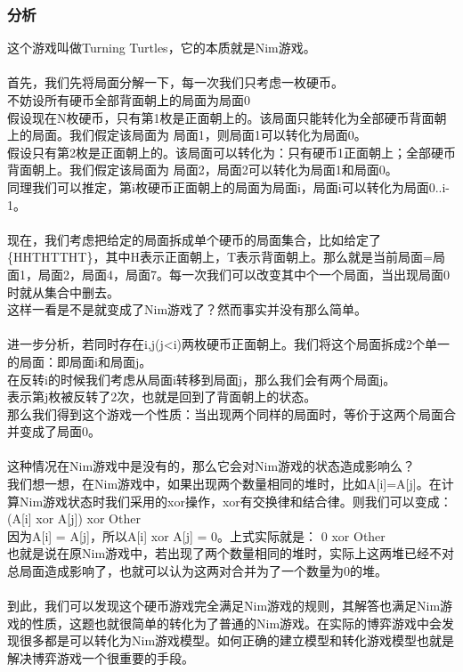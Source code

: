 	\subsubsection{分析}
	这个游戏叫做Turning Turtles，它的本质就是Nim游戏。\\
	\\
	首先，我们先将局面分解一下，每一次我们只考虑一枚硬币。\\
	不妨设所有硬币全部背面朝上的局面为局面0\\
	假设现在N枚硬币，只有第1枚是正面朝上的。该局面只能转化为全部硬币背面朝上的局面。我们假定该局面为 局面1，则局面1可以转化为局面0。\\
	假设只有第2枚是正面朝上的。该局面可以转化为：只有硬币1正面朝上；全部硬币背面朝上。我们假定该局面为 局面2，局面2可以转化为局面1和局面0。\\
	同理我们可以推定，第i枚硬币正面朝上的局面为局面i，局面i可以转化为局面0..i-1。\\
	\\
	现在，我们考虑把给定的局面拆成单个硬币的局面集合，比如给定了\{HHTHTTHT\}，其中H表示正面朝上，T表示背面朝上。那么就是当前局面={局面1，局面2，局面4，局面7}。每一次我们可以改变其中个一个局面，当出现局面0时就从集合中删去。\\
	这样一看是不是就变成了Nim游戏了？然而事实并没有那么简单。\\
	\\
	进一步分析，若同时存在i,j(j<i)两枚硬币正面朝上。我们将这个局面拆成2个单一的局面：即局面i和局面j。\\
	在反转i的时候我们考虑从局面i转移到局面j，那么我们会有两个局面j。\\
	表示第j枚被反转了2次，也就是回到了背面朝上的状态。\\
	那么我们得到这个游戏一个性质：当出现两个同样的局面时，等价于这两个局面合并变成了局面0。\\
	\\
	这种情况在Nim游戏中是没有的，那么它会对Nim游戏的状态造成影响么？\\
	我们想一想，在Nim游戏中，如果出现两个数量相同的堆时，比如A[i]=A[j]。在计算Nim游戏状态时我们采用的xor操作，xor有交换律和结合律。则我们可以变成：\\
	(A[i] xor A[j]) xor Other\\
	因为A[i] = A[j]，所以A[i] xor A[j] = 0。上式实际就是：
	0 xor Other\\
	也就是说在原Nim游戏中，若出现了两个数量相同的堆时，实际上这两堆已经不对总局面造成影响了，也就可以认为这两对合并为了一个数量为0的堆。\\
	\\
	到此，我们可以发现这个硬币游戏完全满足Nim游戏的规则，其解答也满足Nim游戏的性质，这题也就很简单的转化为了普通的Nim游戏。在实际的博弈游戏中会发现很多都是可以转化为Nim游戏模型。如何正确的建立模型和转化游戏模型也就是解决博弈游戏一个很重要的手段。
	\newpage
